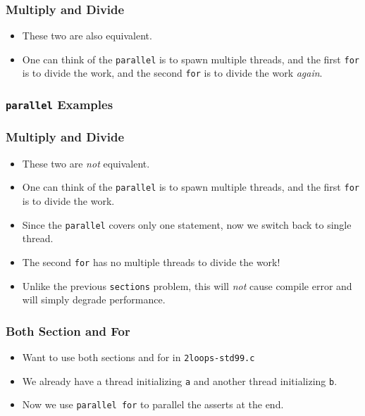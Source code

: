 \documentclass{beamer}
\begin{document}
\begin{frame}
  \frametitle{Multiply and Divide}
  \begin{itemize}
  \item These two are also equivalent.
  \item One can think of the {\tt parallel} is to spawn multiple
    threads, and the first {\tt for} is to divide the work, and the
    second {\tt for} is to divide the work {\em again}.
  \end{itemize}
\end{frame}

\begin{frame}
  \frametitle{{\tt parallel} Examples}
\end{frame}

\begin{frame}
  \frametitle{Multiply and Divide}
  \begin{itemize}
  \item These two are {\em not} equivalent.
  \item One can think of the {\tt parallel} is to spawn multiple
    threads, and the first {\tt for} is to divide the work.
  \item Since the {\tt parallel} covers only one statement, now we
    switch back to single thread.
  \item The second {\tt for} has no multiple threads to divide the work!
  \item Unlike the previous {\tt sections} problem, this will {\em not}
    cause compile error and will simply degrade performance.
  \end{itemize}
\end{frame}


\begin{frame}
  \frametitle{Both Section and For}
  \begin{itemize}
  \item Want to use both sections and for in {\tt 2loops-std99.c}
  \item We already have a thread initializing {\tt a} and another
    thread initializing {\tt b}.
  \item Now we use {\tt parallel for} to parallel the asserts at the
    end.
  \end{itemize}
\end{frame}

\end{document}
